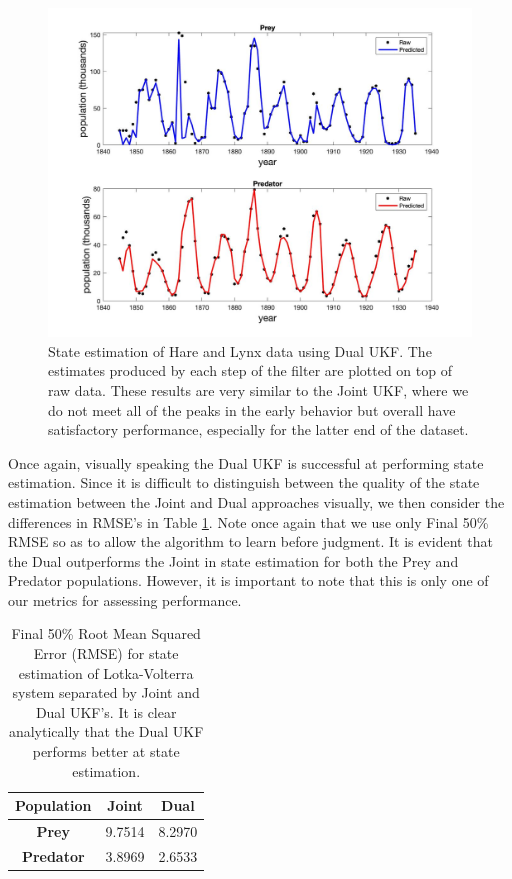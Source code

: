 \begin{figure}[H]
    \centering
    \includegraphics[width=15cm]{Kalman_Filter_Images/LV_Dual_StateEstimation.jpg}
    \caption{State estimation of Hare and Lynx data using Dual UKF. The estimates produced by each step of the filter are plotted on top of raw data. These results are very similar to the Joint UKF, where we do not meet all of the peaks in the early behavior but overall have satisfactory performance, especially for the latter end of the dataset.}
    \label{fig:LV_Dual_StateEstimation}
\end{figure}



Once again, visually speaking the Dual UKF is successful at performing state estimation. Since it is difficult to distinguish between the quality of the state estimation between the Joint and Dual approaches visually, we then consider the differences in RMSE's in Table \ref{table:LV_StateEstimation_RMSE}. Note once again that we use only Final 50\% RMSE so as to allow the algorithm to learn before judgment. It is evident that the Dual outperforms the Joint in state estimation for both the Prey and Predator populations. However, it is important to note that this is only one of our metrics for assessing performance.

\begin{table}[H]
  \begin{center}

    \begin{tabular}{c|c|c} %
      \textbf{Population} & \textbf{Joint} & \textbf{Dual} \\
      \hline
      \textbf{Prey} & 9.7514 & 8.2970\\
      \textbf{Predator} & 3.8969 & 2.6533
    \end{tabular}
    \caption{Final 50\% Root Mean Squared Error (RMSE) for state estimation of Lotka-Volterra system separated by Joint and Dual UKF's. It is clear analytically that the Dual UKF performs better at state estimation.}
    \label{table:LV_StateEstimation_RMSE}
  \end{center}
\end{table}

